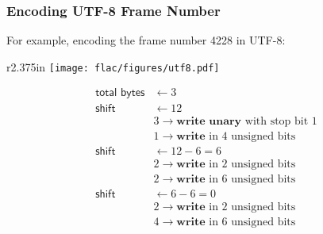 \subsubsection{Encoding UTF-8 Frame Number}
\label{flac:write_utf8}
{
\EALGORITHM
}
\par
\noindent
For example, encoding the frame number 4228 in UTF-8:
\par
\noindent
\begin{wrapfigure}[10]{r}{2.375in}
\texttt{[image: flac/figures/utf8.pdf]}
\end{wrapfigure}
\begin{align*}
\textsf{total bytes} &\leftarrow 3 \\
\textsf{shift} &\leftarrow 12 \\
& 3 \rightarrow \textbf{write unary} \text{ with stop bit 1} \\
& 1 \rightarrow \textbf{write} \text{ in 4 unsigned bits} \\
\textsf{shift} &\leftarrow 12 - 6 = 6 \\
& 2 \rightarrow \textbf{write} \text{ in 2 unsigned bits} \\
& 2 \rightarrow \textbf{write} \text{ in 6 unsigned bits} \\
\textsf{shift} &\leftarrow 6 - 6 = 0 \\
& 2 \rightarrow \textbf{write} \text{ in 2 unsigned bits} \\
& 4 \rightarrow \textbf{write} \text{ in 6 unsigned bits}
\end{align*}


